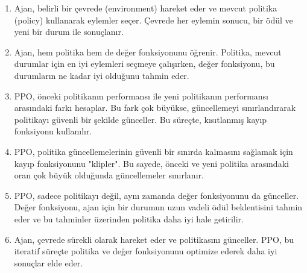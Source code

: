 \begin{enumerate}
    \item Ajan, belirli bir çevrede (environment) hareket eder ve mevcut politika (policy) kullanarak eylemler seçer. Çevrede her eylemin sonucu, bir ödül ve yeni bir durum ile sonuçlanır.
    \item Ajan, hem politika hem de değer fonksiyonunu öğrenir. Politika, mevcut durumlar için en iyi eylemleri seçmeye çalışırken, değer fonksiyonu, bu durumların ne kadar iyi olduğunu tahmin eder.
    \item PPO, önceki politikanın performansı ile yeni politikanın performansı arasındaki farkı hesaplar. Bu fark çok büyükse, güncellemeyi sınırlandırarak politikayı güvenli bir şekilde günceller. Bu süreçte, kısıtlanmış kayıp fonksiyonu kullanılır.
    \item PPO, politika güncellemelerinin güvenli bir sınırda kalmasını sağlamak için kayıp fonksiyonunu "klipler". Bu sayede, önceki ve yeni politika arasındaki oran çok büyük olduğunda güncellemeler sınırlanır.
    \item PPO, sadece politikayı değil, aynı zamanda değer fonksiyonunu da günceller. Değer fonksiyonu, ajan için bir durumun uzun vadeli ödül beklentisini tahmin eder ve bu tahminler üzerinden politika daha iyi hale getirilir.
    \item Ajan, çevrede sürekli olarak hareket eder ve politikasını günceller. PPO, bu iteratif süreçte politika ve değer fonksiyonunu optimize ederek daha iyi sonuçlar elde eder.
\end{enumerate}

\newpage